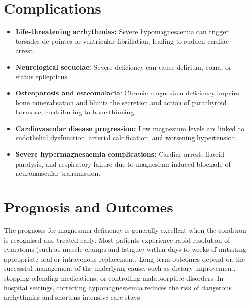 \section*{Complications}
\begin{itemize}
    \item \textbf{Life-threatening arrhythmias:} Severe hypomagnesaemia can trigger torsades de pointes or ventricular fibrillation, leading to sudden cardiac arrest.
    \item \textbf{Neurological sequelae:} Severe deficiency can cause delirium, coma, or status epilepticus.
    \item \textbf{Osteoporosis and osteomalacia:} Chronic magnesium deficiency impairs bone mineralisation and blunts the secretion and action of parathyroid hormone, contributing to bone thinning.
    \item \textbf{Cardiovascular disease progression:} Low magnesium levels are linked to endothelial dysfunction, arterial calcification, and worsening hypertension.
    \item \textbf{Severe hypermagnesaemia complications:} Cardiac arrest, flaccid paralysis, and respiratory failure due to magnesium-induced blockade of neuromuscular transmission.
\end{itemize}

\section*{Prognosis and Outcomes}
The prognosis for magnesium deficiency is generally excellent when the condition is recognised and treated early. Most patients experience rapid resolution of symptoms (such as muscle cramps and fatigue) within days to weeks of initiating appropriate oral or intravenous replacement. Long-term outcomes depend on the successful management of the underlying cause, such as dietary improvement, stopping offending medications, or controlling malabsorptive disorders. In hospital settings, correcting hypomagnesaemia reduces the risk of dangerous arrhythmias and shortens intensive care stays.

